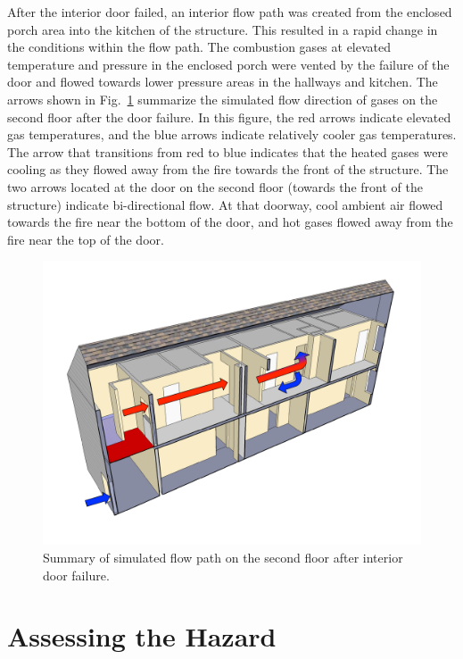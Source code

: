 \documentclass[12pt,oneside]{book}
\begin{document}
After the interior door failed, an interior flow path was created from the enclosed porch area into the kitchen of the structure. This resulted in a rapid change in the conditions within the flow path. The combustion gases at elevated temperature and pressure in the enclosed porch were vented by the failure of the door and flowed towards lower pressure areas in the hallways and kitchen. The arrows shown in Fig.~\ref{fig:flowpath_1} summarize the simulated flow direction of gases on the second floor after the door failure. In this figure, the red arrows indicate elevated gas temperatures, and the blue arrows indicate relatively cooler gas temperatures. The arrow that transitions from red to blue indicates that the heated gases were cooling as they flowed away from the fire towards the front of the structure. The two arrows located at the door on the second floor (towards the front of the structure) indicate bi-directional flow. At that doorway, cool ambient air flowed towards the fire near the bottom of the door, and hot gases flowed away from the fire near the top of the door.

\begin{figure}[!ht]
\centering
\includegraphics[width=.7\textwidth]{../Figures/ChicagoFlow}
\caption{Summary of simulated flow path on the second floor after interior door failure.}
\label{fig:flowpath_1}
\end{figure}


\clearpage


\section{Assessing the Hazard}
\end{document}
